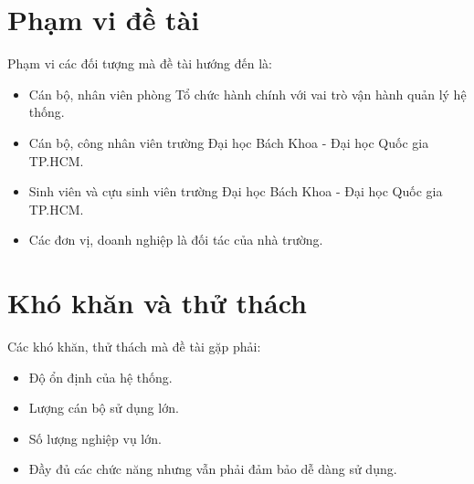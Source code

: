 \section{Phạm vi đề tài}
Phạm vi các đối tượng mà đề tài hướng đến là:
\begin{itemize}
    \item Cán bộ, nhân viên phòng Tổ chức hành chính với vai trò vận hành quản lý hệ thống.
    \item Cán bộ, công nhân viên trường Đại học Bách Khoa - Đại học Quốc gia TP.HCM.
    \item Sinh viên và cựu sinh viên trường Đại học Bách Khoa - Đại học Quốc gia TP.HCM.
    \item Các đơn vị, doanh nghiệp là đối tác của nhà trường.
\end{itemize}
\section{Khó khăn và thử thách}
Các khó khăn, thử thách mà đề tài gặp phải:
\begin{itemize}
    \item Độ ổn định của hệ thống.
    \item Lượng cán bộ sử dụng lớn.
    \item Số lượng nghiệp vụ lớn.
    \item Đầy đủ các chức năng nhưng vẫn phải đảm bảo dễ dàng sử dụng.
\end{itemize}